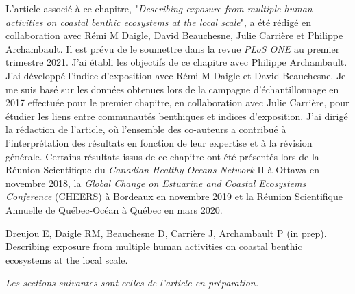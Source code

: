 L'article associé à ce chapitre, "\textit{Describing exposure from multiple human activities on coastal benthic ecosystems at the local scale}", a été rédigé en collaboration avec Rémi M Daigle, David Beauchesne, Julie Carrière et Philippe Archambault. Il est prévu de le soumettre dans la revue \textit{PLoS ONE} au premier trimestre 2021. J'ai établi les objectifs de ce chapitre avec Philippe Archambault. J'ai développé l'indice d'exposition avec Rémi M Daigle et David Beauchesne. Je me suis basé sur les données obtenues lors de la campagne d'échantillonnage en 2017 effectuée pour le premier chapitre, en collaboration avec Julie Carrière, pour étudier les liens entre communautés benthiques et indices d'exposition. J'ai dirigé la rédaction de l'article, où l'ensemble des co-auteurs a contribué à l'interprétation des résultats en fonction de leur expertise et à la révision générale. Certains résultats issus de ce chapitre ont été présentés lors de la Réunion Scientifique du \textit{Canadian Healthy Oceans Network} II à Ottawa en novembre 2018, la \textit{Global Change on Estuarine and Coastal Ecosystems Conference} (CHEERS) à Bordeaux en novembre 2019 et la Réunion Scientifique Annuelle de Québec-Océan à Québec en mars 2020. \linebreak[4]

\begin{singlespace}
Dreujou E, Daigle RM, Beauchesne D, Carrière J, Archambault P (in prep). Describing exposure from multiple human activities on coastal benthic ecosystems at the local scale.
\end{singlespace}

\textit{Les sections suivantes sont celles de l'article en préparation.}

